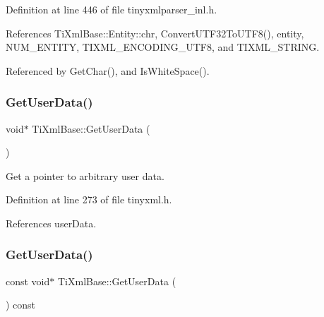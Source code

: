 Definition at line 446 of file tinyxmlparser\+\_\+inl.\+h.



References Ti\+Xml\+Base\+::\+Entity\+::chr, Convert\+U\+T\+F32\+To\+U\+T\+F8(), entity, N\+U\+M\+\_\+\+E\+N\+T\+I\+TY, T\+I\+X\+M\+L\+\_\+\+E\+N\+C\+O\+D\+I\+N\+G\+\_\+\+U\+T\+F8, and T\+I\+X\+M\+L\+\_\+\+S\+T\+R\+I\+NG.



Referenced by Get\+Char(), and Is\+White\+Space().

\hypertarget{class_ti_xml_base_a6559a530ca6763fc301a14d77ed28c17}{}\label{class_ti_xml_base_a6559a530ca6763fc301a14d77ed28c17} 
\subsubsection{\texorpdfstring{Get\+User\+Data()}{GetUserData()}\hspace{0.1cm}{\footnotesize\ttfamily [1/2]}}
{\footnotesize\ttfamily void$\ast$ Ti\+Xml\+Base\+::\+Get\+User\+Data (\begin{DoxyParamCaption}{ }\end{DoxyParamCaption})\hspace{0.3cm}{\ttfamily [inline]}}



Get a pointer to arbitrary user data. 



Definition at line 273 of file tinyxml.\+h.



References user\+Data.

\hypertarget{class_ti_xml_base_aaaaefcef8c0e6e32f8920f4982b2daf3}{}\label{class_ti_xml_base_aaaaefcef8c0e6e32f8920f4982b2daf3} 
\subsubsection{\texorpdfstring{Get\+User\+Data()}{GetUserData()}\hspace{0.1cm}{\footnotesize\ttfamily [2/2]}}
{\footnotesize\ttfamily const void$\ast$ Ti\+Xml\+Base\+::\+Get\+User\+Data (\begin{DoxyParamCaption}{ }\end{DoxyParamCaption}) const\hspace{0.3cm}{\ttfamily [inline]}}



